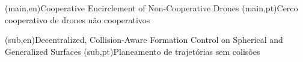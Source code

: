 
%



%
%
%
%
\nttitle(main,en){Cooperative Encirclement of Non-Cooperative Drones}%
\nttitle(main,pt){Cerco cooperativo de drones não cooperativos}%

\nttitle(sub,en){Decentralized, Collision-Aware Formation Control on Spherical and Generalized Surfaces}%
\nttitle(sub,pt){Planeamento de trajetórias sem colisões}%



%
%
%
%



